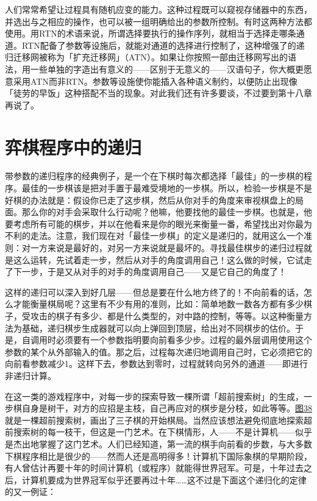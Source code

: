 \documentclass[
  12pt,
  twoside,
  openright,
  oldfontcommands,
]{memoir}
\begin{document}
人们常常希望让过程具有随机应变的能力。这种过程既可以窥视存储器中的东西，并选出与之相应的操作，也可以被一组明确给出的参数所控制。有时这两种方法都使用。用RTN的术语来说，所谓选择要执行的操作序列，就相当于选择走哪条通道。RTN配备了参数等设施后，就能对通道的选择进行控制了，这种增强了的递归迁移网被称为「扩充迁移网」（ATN）。如果让你按照一部由迁移网写出的语法，用一些单独的字造出有意义的------区别于无意义的------汉语句子，你大概更愿意采用ATN而非RTN。参数等设施使你能插入各种语义制约，以便防止出现像「徒劳的早饭」这种搭配不当的现象。对此我们还有许多要谈，不过要到第十八章再说了。

\section{弈棋程序中的递归}

带参数的递归程序的经典例子，是一个在下棋时每次都选择「最佳」的一步棋的程序。最佳的一步棋该是把对手置于最难受境地的一步棋。所以，检验一步棋是不是好棋的办法就是：假设你已走了这步棋，然后从你对手的角度来审视棋盘上的局面。那么你的对手会采取什么行动呢？他嘛，他要找他的最佳一步棋。也就是，他要考虑所有可能的棋步，并以在他看来是你的眼光来衡量一番，希望找出对你最为不利的走法。注意，我们现在对「最佳一步棋」的定义是递归的，就用这么一个准则：对一方来说是最好的，对另一方来说就是最坏的。寻找最佳棋步的递归过程就是这么运转，先试着走一步，然后从对手的角度调用自己！这么做的时候，它试走了下一步，于是又从对手的对手的角度调用自己------又是它自己的角度了！

这样的递归可以深入到好几层------但总是要在什么地方终了的！不向前看的话，怎么才能衡量棋局呢？这里有不少有用的准则，比如：简单地数一数各方都有多少棋子，受攻击的棋子有多少、都是什么类型的，对中路的控制，等等。以这种衡量方法为基础，递归棋步生成器就可以向上弹回到顶层，给出对不同棋步的估价。于是，自调用时必须要有一个参数指明要向前看多少步。过程的最外层调用使用这个参数的某个从外部输入的值。那之后，过程每次递归地调用自己时，它必须把它的向前看参数减少1。这样下去，参数达到零时，过程就转向另外的通道------即进行非递归计算。

在这一类的游戏程序中，对每一步的探索导致一棵所谓「超前搜索树」的生成，一步棋自身是树干，对方的应招是主枝，自己再应对的棋步是分枝，如此等等。\hyperref[fig:38]{图38}就是一棵超前搜索树，画出了三子棋的开始棋局。当然应该想法避免彻底地探索超前搜索树的每一枝干，但这是一门艺术。在下棋情形，人------不是计算机------似乎是杰出地掌握了这门艺术。人们已经知道，第一流的棋手向前看的步数，与大多数下棋程序相比是很少的------然而人还是高明得多！计算机下国际象棋的早期阶段，有人曾估计再要十年的时间计算机（或程序）就能得世界冠军。可是，十年过去之后，计算机要成为世界冠军似乎还要再过十年\ldots\ldots 这不过是下面这个递归化的定律的又一例证：
\end{document}
